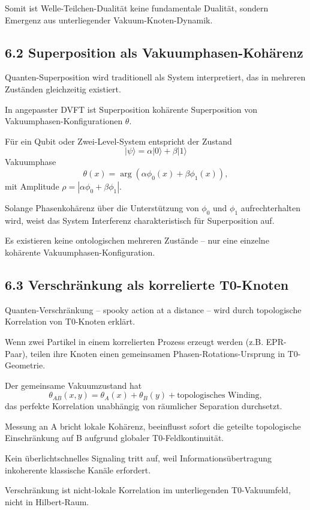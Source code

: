 	Somit ist Welle-Teilchen-Dualität keine fundamentale Dualität, sondern Emergenz aus unterliegender Vakuum-Knoten-Dynamik.
	
	\subsection{6.2 Superposition als Vakuumphasen-Kohärenz}
	
	Quanten-Superposition wird traditionell als System interpretiert, das in mehreren Zuständen gleichzeitig existiert.
	
	In angepasster DVFT ist Superposition kohärente Superposition von Vakuumphasen-Konfigurationen $\theta$.
	
	Für ein Qubit oder Zwei-Level-System entspricht der Zustand
	\[
	|\psi\rangle = \alpha |0\rangle + \beta |1\rangle
	\]
	Vakuumphase
	\[
	\theta(x) = \arg(\alpha \phi_0(x) + \beta \phi_1(x)),
	\]
	mit Amplitude $\rho = |\alpha \phi_0 + \beta \phi_1|$.
	
	Solange Phasenkohärenz über die Unterstützung von $\phi_0$ und $\phi_1$ aufrechterhalten wird, weist das System Interferenz charakteristisch für Superposition auf.
	
	Es existieren keine ontologischen mehreren Zustände – nur eine einzelne kohärente Vakuumphasen-Konfiguration.
	
	\subsection{6.3 Verschränkung als korrelierte T0-Knoten}
	
	Quanten-Verschränkung – spooky action at a distance – wird durch topologische Korrelation von T0-Knoten erklärt.
	
	Wenn zwei Partikel in einem korrelierten Prozess erzeugt werden (z.B. EPR-Paar), teilen ihre Knoten einen gemeinsamen Phasen-Rotations-Ursprung in T0-Geometrie.
	
	Der gemeinsame Vakuumzustand hat
	\[
	\theta_{AB}(x,y) = \theta_A(x) + \theta_B(y) + \text{topologisches Winding},
	\]
	das perfekte Korrelation unabhängig von räumlicher Separation durchsetzt.
	
	Messung an A bricht lokale Kohärenz, beeinflusst sofort die geteilte topologische Einschränkung auf B aufgrund globaler T0-Feldkontinuität.
	
	Kein überlichtschnelles Signaling tritt auf, weil Informationsübertragung inkoherente klassische Kanäle erfordert.
	
	Verschränkung ist nicht-lokale Korrelation im unterliegenden T0-Vakuumfeld, nicht in Hilbert-Raum.
	
